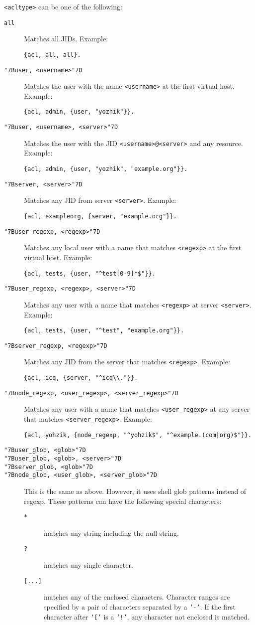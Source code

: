 \documentclass[a4paper,10pt]{article}
\newcommand{\bracehack}{\def\{{\char"7B}\def\}{\char"7D}}
\newcommand{\titem}[1]{\item[\bracehack\texttt{#1}]}
\newcommand{\term}[1]{\texttt{#1}}
\begin{document}
\term{<acltype>} can be one of the following:
\begin{description}
\titem{all} Matches all JIDs. Example:
\begin{verbatim}
{acl, all, all}.
\end{verbatim}
\titem{\{user, <username>\}} Matches the user with the name
  \term{<username>} at the first virtual host. Example:
\begin{verbatim}
{acl, admin, {user, "yozhik"}}.
\end{verbatim}
\titem{\{user, <username>, <server>\}} Matches the user with the JID
  \term{<username>@<server>} and any resource. Example:
\begin{verbatim}
{acl, admin, {user, "yozhik", "example.org"}}.
\end{verbatim}
\titem{\{server, <server>\}} Matches any JID from server
  \term{<server>}. Example:
\begin{verbatim}
{acl, exampleorg, {server, "example.org"}}.
\end{verbatim}
\titem{\{user\_regexp, <regexp>\}} Matches any local user with a name that
  matches \term{<regexp>} at the first virtual host. Example:
\begin{verbatim}
{acl, tests, {user, "^test[0-9]*$"}}.
\end{verbatim}
\titem{\{user\_regexp, <regexp>, <server>\}} Matches any user with a name
  that matches \term{<regexp>} at server \term{<server>}. Example:
\begin{verbatim}
{acl, tests, {user, "^test", "example.org"}}.
\end{verbatim}
\titem{\{server\_regexp, <regexp>\}} Matches any JID from the server that
  matches \term{<regexp>}. Example:
\begin{verbatim}
{acl, icq, {server, "^icq\\."}}.
\end{verbatim}
\titem{\{node\_regexp, <user\_regexp>, <server\_regexp>\}} Matches any user
  with a name that matches \term{<user\_regexp>} at any server that matches
  \term{<server\_regexp>}. Example:
\begin{verbatim}
{acl, yohzik, {node_regexp, "^yohzik$", "^example.(com|org)$"}}.
\end{verbatim}
\titem{\{user\_glob, <glob>\}}
\titem{\{user\_glob, <glob>, <server>\}}
\titem{\{server\_glob, <glob>\}}
\titem{\{node\_glob, <user\_glob>, <server\_glob>\}} This is the same as
  above. However, it uses shell glob patterns instead of regexp. These patterns
  can have the following special characters:
  \begin{description}
  \titem{*} matches any string including the null string.
  \titem{?} matches any single character.
  \titem{[...]} matches any of the enclosed characters. Character
    ranges are specified by a pair of characters separated by a \term{`-'}.
    If the first character after \term{`['} is a \term{`!'}, any
    character not enclosed is matched.
  \end{description}
\end{description}
\end{document}
